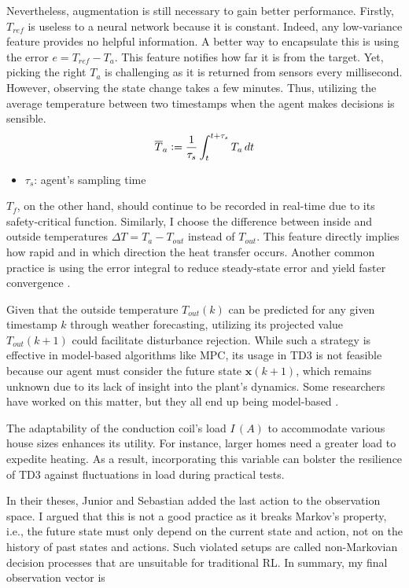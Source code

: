 \documentclass[../main.tex]{subfiles}
\begin{document}
 Nevertheless, augmentation is still necessary to gain better performance. Firstly, $T_{ref}$ is useless to a neural network because it is constant. Indeed, any low-variance feature provides no helpful information. A better way to encapsulate this is using the error $e = T_{ref} - T_a$. This feature notifies how far it is from the target. Yet, picking the right $T_a$ is challenging as it is returned from sensors every millisecond. However, observing the state change takes a few minutes. Thus, utilizing the average temperature between two timestamps when the agent makes decisions is sensible.
    $$
    \overline{T}_a \vcentcolon= \frac{1}{\tau_s}\int_{t}^{t+\tau_s} T_a \,dt
    $$
\begin{itemize}
    \item $\tau_s$: agent's sampling time
\end{itemize}
$T_f$, on the other hand, should continue to be recorded in real-time due to its safety-critical function. Similarly, I choose the difference between inside and outside temperatures $\Delta T = T_a - T_{out}$ instead of $T_{out}$. This feature directly implies how rapid and in which direction the heat transfer occurs. Another common practice is using the error integral to reduce steady-state error and yield faster convergence \cite{weber2022ss}. 

Given that the outside temperature $T_{out}(k)$ can be predicted for any given timestamp $k$ through weather forecasting, utilizing its projected value $T_{out}(k+1)$ could facilitate disturbance rejection. While such a strategy is effective in model-based algorithms like MPC, its usage in TD3 is not feasible because our agent must consider the future state $\textbf{x}(k+1)$, which remains unknown due to its lack of insight into the plant's dynamics. Some researchers have worked on this matter, but they all end up being model-based \cite{chen2019gnu,fu21mpctd3}.

The adaptability of the conduction coil's load $I \,(A)$ to accommodate various house sizes enhances its utility. For instance, larger homes need a greater load to expedite heating. As a result, incorporating this variable can bolster the resilience of TD3 against fluctuations in load during practical tests.

In their theses, Junior \cite{junior22} and Sebastian \cite{seb23} added the last action to the observation space. I argued that this is not a good practice as it breaks Markov's property, i.e., the future state must only depend on the current state and action, not on the history of past states and actions. Such violated setups are called non-Markovian decision processes that are unsuitable for traditional RL. In summary, my final observation vector is
\end{document}
